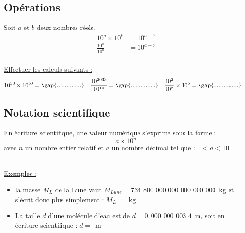 \subsection{Opérations}
\begin{tcolorbox}[colback=red!5!white,colframe=red!75!black,title=\textbf{Règles de calculs des puissances de 10}]
Soit $a$ et $b$ deux nombres réels.
\begin{align*}
    10^{a}\times 10^b &= 10^{a+b} \\
    \frac{10^{a}}{10^b} &= 10^{a-b} \\
\end{align*}

\end{tcolorbox}
\underline{Effectuer les calculs suivants :}
\begin{align*}
    10^{30} \times 10^{50} &= \text{\gap{...............}} & \frac{10^{2033}}{10^{10}} &= \text{\gap{...............}} & \frac{10^2}{10^8}\times 10^5 &= \text{\gap{...............}}
\end{align*}
\subsection{Notation scientifique}

\begin{tcolorbox}[colback=green!5!white,colframe=green!75!black,title=\textbf{Ecriture scientifique d'un nombre}, upperbox=invisible]
En écriture scientifique, une valeur numérique s'exprime sous la forme :
\begin{equation*}
    a \times 10^n
\end{equation*}
avec $n$ un nombre entier relatif et $a$ un nombre décimal tel que : $1< a <10$.\\
\\
\end{tcolorbox}
\underline{Exemples :}
\begin{itemize}
    \item la masse $M_{L}$ de la Lune vaut $M_{Lune}=734$ $800$ $000$ $000$ $000$ $000$ $000$~kg et s'écrit donc plus simplement : $M_L=$~kg
    \item La taille $d$ d'une molécule d'eau est de  $d=0,000$ $000$ $003$ $4$~m, soit en écriture scientifique : $d=$~m
\end{itemize}

